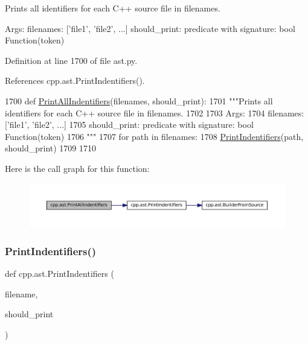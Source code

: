 \begin{DoxyVerb}Prints all identifiers for each C++ source file in filenames.

Args:
  filenames: ['file1', 'file2', ...]
  should_print: predicate with signature: bool Function(token)
\end{DoxyVerb}
 

Definition at line 1700 of file ast.\+py.



References cpp.\+ast.\+Print\+Indentifiers().


\begin{DoxyCode}
1700 \textcolor{keyword}{def }\hyperlink{namespacecpp_1_1ast_abc501124095357c1cf56eaf10e1df327}{PrintAllIndentifiers}(filenames, should\_print):
1701     \textcolor{stringliteral}{"""Prints all identifiers for each C++ source file in filenames.}
1702 \textcolor{stringliteral}{}
1703 \textcolor{stringliteral}{    Args:}
1704 \textcolor{stringliteral}{      filenames: ['file1', 'file2', ...]}
1705 \textcolor{stringliteral}{      should\_print: predicate with signature: bool Function(token)}
1706 \textcolor{stringliteral}{    """}
1707     \textcolor{keywordflow}{for} path \textcolor{keywordflow}{in} filenames:
1708         \hyperlink{namespacecpp_1_1ast_a6a793b93aff7779af7017d001ce3b226}{PrintIndentifiers}(path, should\_print)
1709 
1710 
\end{DoxyCode}
Here is the call graph for this function\+:
\nopagebreak
\begin{figure}[H]
\begin{center}
\leavevmode
\includegraphics[width=350pt]{namespacecpp_1_1ast_abc501124095357c1cf56eaf10e1df327_cgraph}
\end{center}
\end{figure}
\mbox{\label{namespacecpp_1_1ast_a6a793b93aff7779af7017d001ce3b226}} 
\subsubsection{\texorpdfstring{Print\+Indentifiers()}{PrintIndentifiers()}}
{\footnotesize\ttfamily def cpp.\+ast.\+Print\+Indentifiers (\begin{DoxyParamCaption}\item[{}]{filename,  }\item[{}]{should\+\_\+print }\end{DoxyParamCaption})}


